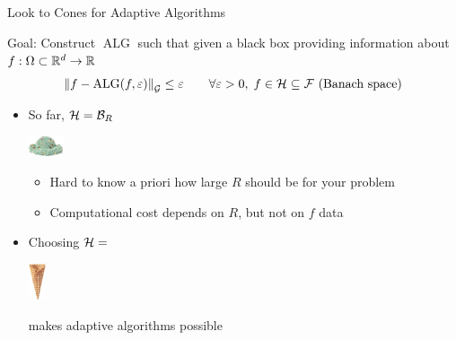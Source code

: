 \documentclass[10pt,compress,xcolor={usenames,dvipsnames},aspectratio=169]{beamer}
\DeclareMathOperator{\alg}{ALG}
\newcommand{\scoop}[1]{\parbox{#1}{\includegraphics[width=#1]{IceCreamScoop.eps}}\xspace}
\newcommand{\smallscoop}{\scoop{1cm}}
\newcommand{\smallcone}{\parbox{1.1cm}{\includegraphics[width=0.5cm,angle=270]{MediumWaffleCone.eps}}\xspace}
\begin{document}
\begin{frame}{Look to Cones for Adaptive Algorithms}

\vspace{-4ex}
\alert{Goal:} Construct $\alg$  such that given a \alert{black box} providing information about $f: \Omega \subset \mathbb{R}^d \to \mathbb{R}$
\begin{equation*}
    \norm[\cg]{f - \alg(f,\varepsilon)} \le \varepsilon \qquad \forall \varepsilon > 0, \; f \in \ch \subseteq \cf \text{ (Banach space)}
\end{equation*}

\vspace{-5ex}

\begin{itemize}
    \item So far, $\mathcal{H} = \mathcal{B}_R$ \smallscoop
    \begin{itemize}
	[triangle]
        \item Hard to know a priori how large $R$ should be for your problem
        \item Computational cost depends on $R$, but not on $f$ data
    \end{itemize}
    
    \item Choosing $\mathcal{H} = $ \smallcone makes adaptive algorithms possible

\end{itemize}
\end{frame}
\end{document}
